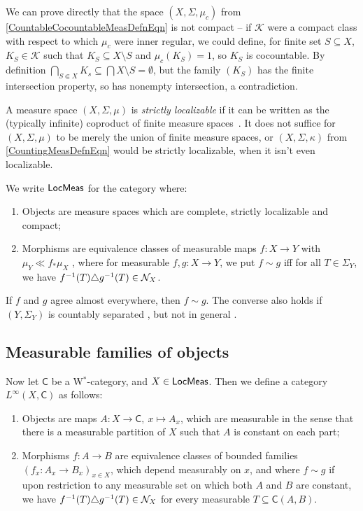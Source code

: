 \documentclass[reqno,T1]{amsproc}
\newcommand{\cat}[1]{\mathsf{#1}}		%
\newcommand{\Kay}{\mathcal{K}} %
\theoremstyle{plain}
\theoremstyle{remark}
\numberwithin{equation}{section}
\begin{document}
We can prove directly that the space $(X,\Sigma,\mu_c)$ from \eqref{CountableCocountableMeasDefnEqn} is not compact -- if $\Kay$ were a compact class with respect to which $\mu_c$ were inner regular, we could define, for finite set $S \subseteq X$, $K_S \in \Kay$ such that $K_S \subseteq X \setminus S$ and $\mu_c(K_S) = 1$, so $K_S$ is cocountable. By definition $\bigcap_{S \Subset X} K_s \subseteq \bigcap X \setminus S = \emptyset$, but the family $(K_S)$ has the finite intersection property, so has nonempty intersection, a contradiction.

A measure space $(X,\Sigma,\mu)$ is \emph{strictly localizable} if it can be written as the (typically infinite) coproduct of finite measure spaces~\cite[211E]{fremlin2}. It does not suffice for $(X,\Sigma,\mu)$ to be merely the union of finite measure spaces, or $(X,\Sigma,\kappa)$ from \eqref{CountingMeasDefnEqn} would be strictly localizable, when it isn't even localizable. 

We write $\LMeas$ for the category where:
\begin{enumerate}
\item Objects are measure spaces which are complete, strictly localizable and compact;
\item Morphisms are equivalence classes of measurable maps $f : X \to Y$ with $\mu_Y \ll f_* \mu_X$ , where for measurable $f,g : X \to Y$, we put $f \sim g$ iff for all $T \in \Sigma_Y$, we have $f^{-1}(T) \triangle g^{-1}(T) \in \mathcal{N}_X$.
\end{enumerate}

If $f$ and $g$ agree almost everywhere, then $f \sim g$. The converse also holds if $(Y,\Sigma_Y)$ is countably separated \cite[343F]{fremlin3}, but not in general \cite[343I]{fremlin3}. 


\subsection{Measurable families of objects}

Now let $\cat{C}$ be a W$^*$-category, and $X \in \LMeas$. Then we define a category $L^\infty(X,\cat{C})$ as follows:

\begin{enumerate}
\item Objects are maps $A : X \to \cat{C}, \: x\mapsto A_x$, which are measurable in the sense that there is a measurable partition of $X$ such that $A$ is constant on each part;
\item Morphisms $f : A\to B$ are equivalence classes of bounded families $(f_x : A_x\to B_x)_{x\in X}$, which depend measurably  on $x$, and where $f \sim g$ if upon restriction to any measurable set on which both $A$ and $B$ are constant, we have $f^{-1}(T) \triangle g^{-1}(T) \in \mathcal{N}_X$ for every measurable $T \subseteq \cat{C}(A,B)$.
\end{enumerate}
\end{document}
